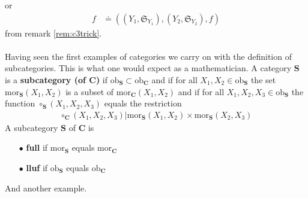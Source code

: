 or
\begin{align*}
  f
  &\doteq
  \left(
    (Y_{1},\mathfrak{S}_{Y_{1}}),
    (Y_{2},\mathfrak{S}_{Y_{2}}),
    f
  \right)
\end{align*}
from remark \ref{rem:c3trick}.
\\\\
Having seen the first examples of categories we carry on with the definition of
subcategories. This is what one would expect as a mathematician. A category $\mathbf{S}$ is a \textbf{subcategory (of $\mathbf{C}$)} if $\mathrm{ob}_{\mathbf{S}} \subset \mathrm{ob}_{\mathbf{C}}$ and if for all $X_{1},X_{2} \in \mathrm{ob}_{\mathbf{S}}$ the set $\mathrm{mor}_{\mathbf{S}}(X_{1},X_{2})$ is a subset of $\mathrm{mor}_{\mathbf{C}}(X_{1},X_{2})$ and if for all $X_{1},X_{2},X_{3} \in \mathrm{ob}_{\mathbf{S}}$ the function $\circ_{\mathbf{S}}(X_{1},X_{2},X_{3})$ equals the restriction
\begin{align*}
  \circ_{\mathbf{C}}(X_{1},X_{2},X_{3})
  \vert
  \mathrm{mor}_{\mathbf{S}}(X_{1},X_{2})
  \times
  \mathrm{mor}_{\mathbf{S}}(X_{2},X_{3})
\end{align*}
A subcategory $\mathbf{S}$ of $\mathbf{C}$ is
\begin{enumerate}
\item[$\bullet$]
\textbf{full} if $\mathrm{mor}_{\mathbf{S}}$ equals $\mathrm{mor}_{\mathbf{C}}$
\item[$\bullet$]
\textbf{lluf} if $\mathrm{ob}_{\mathbf{S}}$ equals $\mathrm{ob}_{\mathbf{C}}$
\end{enumerate}
And another example.
\\
